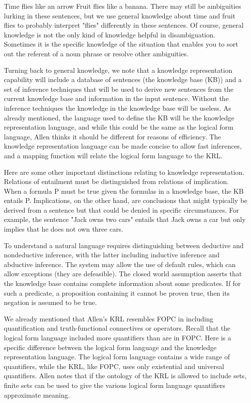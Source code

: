 Time flies like an arrow
Fruit flies like a banana. 
There may still be ambiguities lurking in these sentences, but we use general knowledge about time and fruit flies to probably interpret "flies" differently in these sentences. Of course, general knowledge is not the only kind of knowledge helpful in disambiguation. Sometimes it is the specific knowledge of the situation that enables you to sort out the referent of a noun phrase or resolve other ambiguities.

Turning back to general knowledge, we note that a knowledge representation capability will include a database of sentences (the knowledge base (KB)) and a set of inference techniques that will be used to derive new sentences from the current knowledge base and information in the input sentence. Without the inference techniques the knowledge in the knowledge base will be useless. As already mentioned, the language used to define the KB will be the knowledge representation language, and while this could be the same as the logical form language, Allen thinks it should be different for reasons of efficiency. The knowledge representation language can be made concise to allow fast inferences, and a mapping function will relate the logical form language to the KRL.

Here are some other important distinctions relating to knowledge representation. Relations of entailment must be distinguished from relations of implication. When a formula P must be true given the formulas in a knowledge base, the KB entails P. Implications, on the other hand, are conclusions that might typically be derived from a sentence but that could be denied in specific circumstances. For example, the sentence "Jack owns two cars" entails that Jack owns a car but only implies that he does not own three cars.

To understand a natural language requires distinguishing between deductive and nondeductive inference, with the latter including inductive inference and abductive inference. The system may allow the use of default rules, which can allow exceptions (they are defeasible). The closed world assumption asserts that the knowledge base contains complete information about some predicates. If for such a predicate, a proposition containing it cannot be proven true, then its negation is assumed to be true.

We already mentioned that Allen's KRL resembles FOPC in including quantification and truth-functional connectives or operators. Recall that the logical form language included more quantifiers than are in FOPC. Here is a specific difference between the logical form language and the knowledge representation language. The logical form language contains a wide range of quantifiers, while the KRL, like FOPC, uses only existential and universal quantifiers. Allen notes that if the ontology of the KRL is allowed to include sets, finite sets can be used to give the various logical form language quantifiers approximate meaning.

